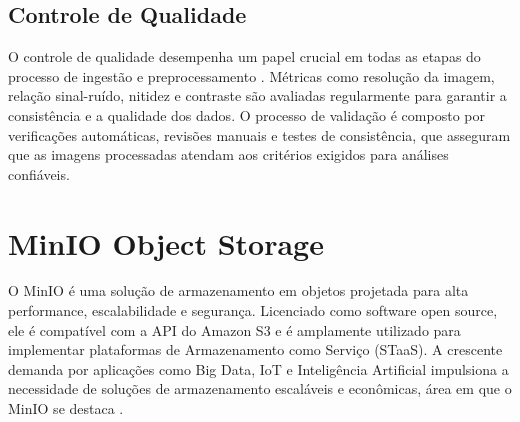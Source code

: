 \subsection{Controle de Qualidade}
O controle de qualidade desempenha um papel crucial em todas as etapas do processo de ingestão e preprocessamento \cite{chen2023quality}. Métricas como resolução da imagem, relação sinal-ruído, nitidez e contraste são avaliadas regularmente para garantir a consistência e a qualidade dos dados. O processo de validação é composto por verificações automáticas, revisões manuais e testes de consistência, que asseguram que as imagens processadas atendam aos critérios exigidos para análises confiáveis.


\section{MinIO Object Storage}
O MinIO é uma solução de armazenamento em objetos projetada para alta performance, escalabilidade e segurança. Licenciado como 
software open source, ele é compatível com a API do Amazon S3 e é amplamente utilizado para implementar plataformas de Armazenamento 
como Serviço (STaaS). A crescente demanda por aplicações como Big Data, IoT e Inteligência Artificial impulsiona a necessidade de 
soluções de armazenamento escaláveis e econômicas, área em que o MinIO se destaca \cite{minio_reference_architecture}. 

